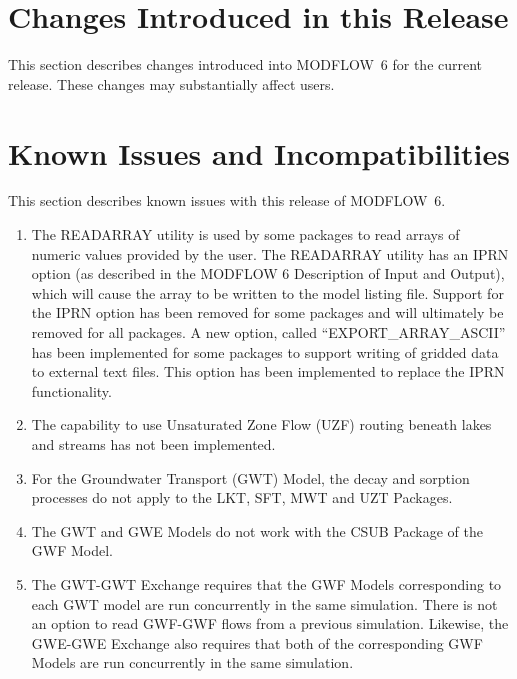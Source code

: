 \documentclass[11pt,twoside,twocolumn]{usgsreport}
\begin{document}
\section{Changes Introduced in this Release}
This section describes changes introduced into MODFLOW~6 for the current release.  These changes may substantially affect users.



\section{Known Issues and Incompatibilities}
This section describes known issues with this release of MODFLOW~6.  

\begin{enumerate}

\item
The READARRAY utility is used by some packages to read arrays of numeric values provided by the user.  The READARRAY utility has an IPRN option (as described in the MODFLOW 6 Description of Input and Output), which will cause the array to be written to the model listing file.  Support for the IPRN option has been removed for some packages and will ultimately be removed for all packages.  A new option, called ``EXPORT\_ARRAY\_ASCII'' has been implemented for some packages to support writing of gridded data to external text files.  This option has been implemented to replace the IPRN functionality.

\item
The capability to use Unsaturated Zone Flow (UZF) routing beneath lakes and streams has not been implemented.

\item
For the Groundwater Transport (GWT) Model, the decay and sorption processes do not apply to the LKT, SFT, MWT and UZT Packages.

\item
The GWT and GWE Models do not work with the CSUB Package of the GWF Model.  

\item
The GWT-GWT Exchange requires that the GWF Models corresponding to each GWT model are run concurrently in the same simulation.  There is not an option to read GWF-GWF flows from a previous simulation.  Likewise, the GWE-GWE Exchange also requires that both of the corresponding GWF Models are run concurrently in the same simulation.


\end{enumerate}
\end{document}
